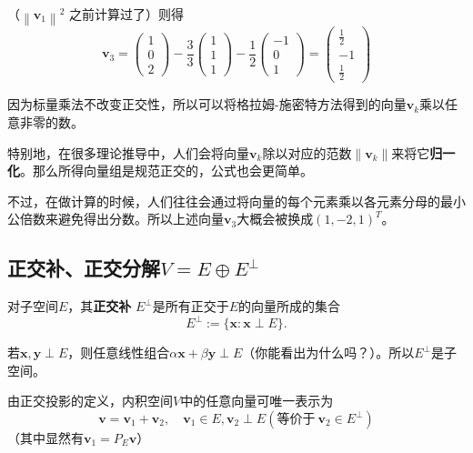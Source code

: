 （$\left\|\mathbf{v}_{1}\right\|^{2}$ 之前计算过了）则得
$$
\mathbf{v}_{3}=\left(\begin{array}{l}
1 \\
0 \\
2
\end{array}\right)-\frac{3}{3}\left(\begin{array}{l}
1 \\
1 \\
1
\end{array}\right)-\frac{1}{2}\left(\begin{array}{r}
-1 \\
0 \\
1
\end{array}\right)=\left(\begin{array}{r}
\frac{1}{2} \\
-1 \\
\frac{1}{2}
\end{array}\right)
$$
\begin{remark*}
    因为标量乘法不改变正交性，所以可以将格拉姆-施密特方法得到的向量$\mathbf{v}_k$乘以任意非零的数。

    特别地，在很多理论推导中，人们会将向量$\mathbf{v}_k$除以对应的范数$\|\mathbf{v}_k\|$来将它{\bf 归一化}。那么所得向量组是规范正交的，公式也会更简单。

    不过，在做计算的时候，人们往往会通过将向量的每个元素乘以各元素分母的最小公倍数来避免得出分数。所以上述向量$\mathbf{v}_3$大概会被换成$(1,-2,1)^T$。
\end{remark*}

\subsection{正交补、正交分解\texorpdfstring{$V=E\oplus E^\perp$}{V=E+Eperp}}\label{subsec:orthogonal_complement}

\begin{definition*}
    对子空间$E$，其{\bf 正交补} $E^{\perp}$是所有正交于$E$的向量所成的集合
    \[E^{\perp}:=\{\mathbf{x}:\mathbf{x}\perp E\}.\]
\end{definition*}

若$\mathbf{x},\mathbf{y}\perp E$，则任意线性组合$\alpha\mathbf{x}+\beta\mathbf{y}\perp E$（你能看出为什么吗？）。所以$E^\perp$是子空间。

由正交投影的定义，内积空间$V$中的任意向量可唯一表示为
\[\mathbf{v}=\mathbf{v}_{1}+\mathbf{v}_{2},\quad\mathbf{v}_{1}\in E,\mathbf{v}_{2}\perp E(\text{等价于}~\mathbf{v}_{2}\in E^{\perp})\]
（其中显然有$\mathbf{v}_1=P_E\mathbf{v}$）

